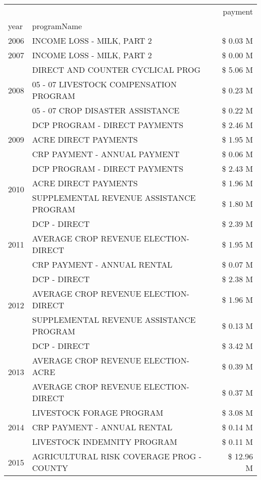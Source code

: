 \begin{tabular}{llr}
\toprule
 &  & payment \\
year & programName &  \\
\midrule
2006 & INCOME LOSS - MILK, PART 2 & \$ 0.03 M \\
\cline{1-3}
2007 & INCOME LOSS - MILK, PART 2 & \$ 0.00 M \\
\cline{1-3}
\multirow[t]{3}{*}{2008} & DIRECT AND COUNTER CYCLICAL PROG & \$ 5.06 M \\
 & 05 - 07 LIVESTOCK COMPENSATION PROGRAM & \$ 0.23 M \\
 & 05 - 07 CROP DISASTER ASSISTANCE & \$ 0.22 M \\
\cline{1-3}
\multirow[t]{3}{*}{2009} & DCP PROGRAM - DIRECT PAYMENTS & \$ 2.46 M \\
 & ACRE DIRECT PAYMENTS & \$ 1.95 M \\
 & CRP PAYMENT - ANNUAL PAYMENT & \$ 0.06 M \\
\cline{1-3}
\multirow[t]{3}{*}{2010} & DCP PROGRAM - DIRECT PAYMENTS & \$ 2.43 M \\
 & ACRE DIRECT PAYMENTS & \$ 1.96 M \\
 & SUPPLEMENTAL REVENUE ASSISTANCE PROGRAM & \$ 1.80 M \\
\cline{1-3}
\multirow[t]{3}{*}{2011} & DCP - DIRECT & \$ 2.39 M \\
 & AVERAGE CROP REVENUE ELECTION-DIRECT & \$ 1.95 M \\
 & CRP PAYMENT - ANNUAL RENTAL & \$ 0.07 M \\
\cline{1-3}
\multirow[t]{3}{*}{2012} & DCP - DIRECT & \$ 2.38 M \\
 & AVERAGE CROP REVENUE ELECTION-DIRECT & \$ 1.96 M \\
 & SUPPLEMENTAL REVENUE ASSISTANCE PROGRAM & \$ 0.13 M \\
\cline{1-3}
\multirow[t]{3}{*}{2013} & DCP - DIRECT & \$ 3.42 M \\
 & AVERAGE CROP REVENUE ELECTION-ACRE & \$ 0.39 M \\
 & AVERAGE CROP REVENUE ELECTION-DIRECT & \$ 0.37 M \\
\cline{1-3}
\multirow[t]{3}{*}{2014} & LIVESTOCK FORAGE PROGRAM & \$ 3.08 M \\
 & CRP PAYMENT - ANNUAL RENTAL & \$ 0.14 M \\
 & LIVESTOCK INDEMNITY PROGRAM & \$ 0.11 M \\
\cline{1-3}
\multirow[t]{3}{*}{2015} & AGRICULTURAL RISK COVERAGE PROG - COUNTY & \$ 12.96 M \\

\end{tabular}
